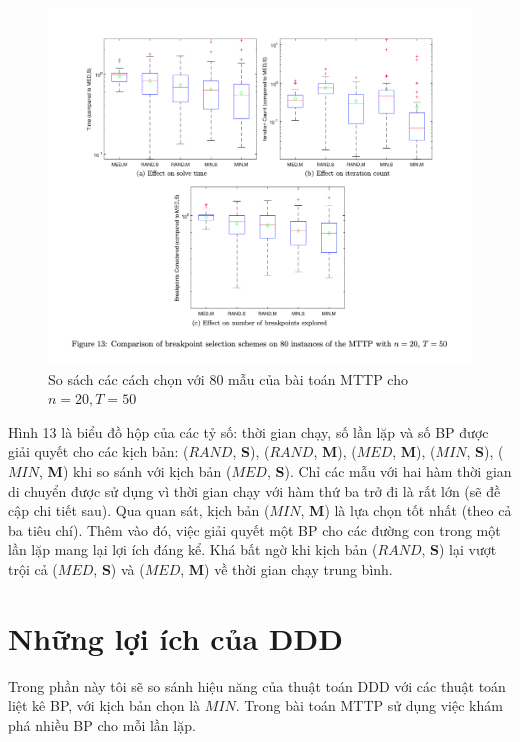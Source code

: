 \documentclass[../main.tex]{subfiles}
\begin{document}
\begin{figure}
\centering
\includegraphics{images/Figure13.png}
\caption{So sách các cách chọn với 80 mẫu của bài toán MTTP cho
\(n=20, T=50\)}
\label{fig:13}
\end{figure}

Hình 13 là biểu đồ hộp của các tỷ số: thời gian chạy, số lần lặp và số
BP được giải quyết cho các kịch bản: (\(RAND\), \textbf{S}), (\(RAND\),
\textbf{M}), (\(MED\), \textbf{M}), (\(MIN\), \textbf{S}), (\(MIN\),
\textbf{M}) khi so sánh với kịch bản (\(MED\), \textbf{S}). Chỉ các mẫu
với hai hàm thời gian di chuyển được sử dụng vì thời gian chạy với hàm
thứ ba trở đi là rất lớn (sẽ đề cập chi tiết sau). Qua quan sát, kịch
bản (\(MIN\), \textbf{M}) là lựa chọn tốt nhất (theo cả ba tiêu chí).
Thêm vào đó, việc giải quyết một BP cho các đường con trong một lần lặp
mang lại lợi ích đáng kể. Khá bất ngờ khi kịch bản (\(RAND\),
\textbf{S}) lại vượt trội cả (\(MED\), \textbf{S}) và (\(MED\),
\textbf{M}) về thời gian chạy trung bình.

\section{Những lợi ích của
DDD}\label{nhux1eefng-lux1ee3i-uxedch-cux1ee7a-ddd}

Trong phần này tôi sẽ so sánh hiệu năng của thuật toán DDD với các thuật
toán liệt kê BP, với kịch bản chọn là \(MIN\). Trong bài toán MTTP sử
dụng việc khám phá nhiều BP cho mỗi lần lặp.
\end{document}
